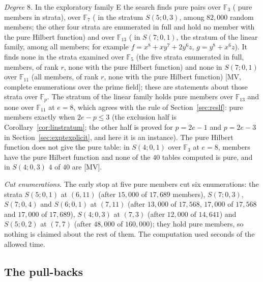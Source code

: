 \documentclass[11pt]{article}
\theoremstyle{definition}
\theoremstyle{remark}
\newcommand{\F}{\mathbb{F}}
\begin{document}
\emph{Degree $8$.} In the exploratory family E the search finds pure pairs over $\F_3$ (\nwcEEightThreePure{} pure members in \nwcEEightThreeStrataPure{} strata), over $\F_7$ (\nwcEEightSevenPure{} in the stratum $S(5;0,3)$, among $82{,}000$ random members; the other four strata are enumerated in full and hold no member with the pure Hilbert function) and over $\F_{13}$ (\nwcEEightThirteenPure{} in $S(7;0,1)$, the stratum of the linear family, among all \nwcEEightThirteenExamined{} members; for example $f=x^8+xy^7+2y^6z$, $g=y^8+x^6z$). It finds none in the strata examined over $\F_5$ (the five strata enumerated in full, \nwcEEightFiveExamined{} members, \nwcEEightFiveRankR{} of rank $r$, none with the pure Hilbert function) and none in $S(7;0,1)$ over $\F_{11}$ (all \nwcEEightElevenExamined{} members, \nwcEEightElevenRankR{} of rank $r$, none with the pure Hilbert function) [MV, complete enumerations over the prime field]; these are statements about those strata over $\F_p$. The stratum of the linear family holds pure members over $\F_{13}$ and none over $\F_{11}$ at $e=8$, which agrees with the rule of Section~\ref{sec:reslf}: pure members exactly when $2e-p\le3$ (the exclusion half is Corollary~\ref{cor:linstratum}; the other half is proved for $p=2e-1$ and $p=2e-3$ in Section~\ref{sec:exptexplicit}, and here it is an instance). The pure Hilbert function does not give the pure table: in $S(4;0,1)$ over $\F_3$ at $e=8$, \nwcEEightThreeHFFour{} members have the pure Hilbert function and none of the $40$ tables computed is pure, and in $S(4;0,3)$ $4$ of $40$ are [MV].

\emph{Cut enumerations.} The early stop at five pure members cut six enumerations: the strata $S(5;0,1)$ at $(6,11)$ (after $15{,}000$ of $17{,}689$ members), $S(7;0,3)$, $S(7;0,4)$ and $S(6;0,1)$ at $(7,11)$ (after $13{,}000$ of $17{,}568$, $17{,}000$ of $17{,}568$ and $17{,}000$ of $17{,}689$), $S(4;0,3)$ at $(7,3)$ (after $12{,}000$ of $14{,}641$) and $S(5;0,2)$ at $(7,7)$ (after $48{,}000$ of $160{,}000$); they hold pure members, so nothing is claimed about the rest of them. The computation used \nwcSeconds{} seconds of the allowed time.

\subsection{The pull-backs}
\label{sec:respull}
\end{document}
